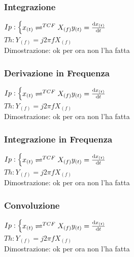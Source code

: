         \subsubsection{Integrazione}\label{Integrazione}
            $Ip:\begin{cases}
                x_{(t)}\rightleftharpoons^{TCF} X_{(f)}
                y_{(t)}= \derivative{x_{(t)}}{t}\\        
            \end{cases}$\\
            $Th: Y_{(f)} = j2\pi f X_{(f)} $ \\
            Dimostrazione: ok per ora non l'ha fatta
            
        \subsubsection{Derivazione in Frequenza}\label{Derivazione in Frequenza}
            $Ip:\begin{cases}
                x_{(t)}\rightleftharpoons^{TCF} X_{(f)}
                y_{(t)}= \derivative{x_{(t)}}{t}\\        
            \end{cases}$\\
            $Th: Y_{(f)} = j2\pi f X_{(f)} $ \\
            Dimostrazione: ok per ora non l'ha fatta
                
        \subsubsection{Integrazione in Frequenza}\label{Integrazione in Frequenza}
            $Ip:\begin{cases}
                x_{(t)}\rightleftharpoons^{TCF} X_{(f)}
                y_{(t)}= \derivative{x_{(t)}}{t}\\        
            \end{cases}$\\
            $Th: Y_{(f)} = j2\pi f X_{(f)} $ \\
            Dimostrazione: ok per ora non l'ha fatta
            
        \subsubsection{Convoluzione}\label{Convoluzione}
            $Ip:\begin{cases}
                x_{(t)}\rightleftharpoons^{TCF} X_{(f)}
                y_{(t)}= \derivative{x_{(t)}}{t}\\        
            \end{cases}$\\
            $Th: Y_{(f)} = j2\pi f X_{(f)} $ \\
            Dimostrazione: ok per ora non l'ha fatta
                

